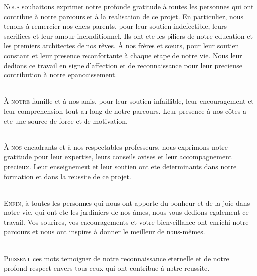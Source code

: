 
\lettrine[nindent=0em, slope=-.5em] {\color{Eblue}N}{ous} souhaitons exprimer notre profonde gratitude à toutes les personnes qui ont contribue à notre parcours et à la realisation de ce projet. En particulier, nous tenons à remercier nos chers parents, pour leur soutien indefectible, leurs sacrifices et leur amour inconditionnel. Ils ont ete les piliers de notre education et les premiers architectes de nos rêves. À nos frères et sœurs, pour leur soutien constant et leur presence reconfortante à chaque etape de notre vie. Nous leur dedions ce travail en signe d'affection et de reconnaissance pour leur precieuse contribution à notre epanouissement.

\ \\
\lettrine[nindent=0em, slope=-.5em] {\color{Eblue}À}{ notre} famille et à nos amis, pour leur soutien infaillible, leur encouragement et leur comprehension tout au long de notre parcours. Leur presence à nos côtes a ete une source de force et de motivation.

\ \\
\lettrine[nindent=0em, slope=-.5em] {\color{Eblue}À}{ nos} encadrants et à nos respectables professeurs, nous exprimons notre gratitude pour leur expertise, leurs conseils avises et leur accompagnement precieux. Leur enseignement et leur soutien ont ete determinants dans notre formation et dans la reussite de ce projet.

\ \\
\lettrine[nindent=0em, slope=-.5em] {\color{Eblue}E}{nfin}, à toutes les personnes qui nous ont apporte du bonheur et de la joie dans notre vie, qui ont ete les jardiniers de nos âmes, nous vous dedions egalement ce travail. Vos sourires, vos encouragements et votre bienveillance ont enrichi notre parcours et nous ont inspires à donner le meilleur de nous-mêmes.

\ \\
\lettrine[nindent=0em, slope=-.5em] {\color{Eblue}P}{uissent} ces mots temoigner de notre reconnaissance eternelle et de notre profond respect envers tous ceux qui ont contribue à notre reussite.
